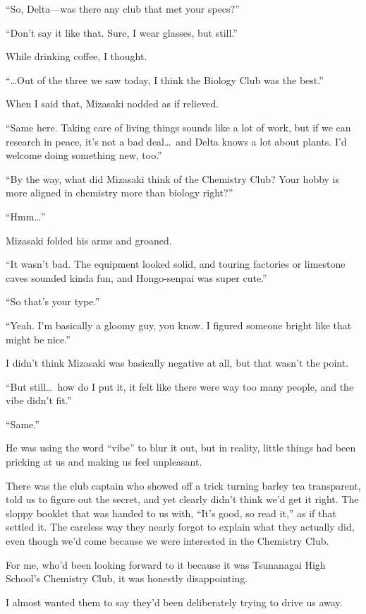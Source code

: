 \documentclass[
    a4paper,
    12pt,
    twoside,
    openany,
    UTF8,
    fontset=windows
]{ctexbook}
\begin{document}
``So, Delta---was there any club that met your specs?''

``Don't say it like that. Sure, I wear glasses, but still.''

While drinking coffee, I thought.

``\dots Out of the three we saw today, I think the Biology Club was the best.''

When I said that, Mizasaki nodded as if relieved.

``Same here. Taking care of living things sounds like a lot of work, but if we can research in peace, it's not a bad deal\dots\ and Delta knows a lot about plants. I'd welcome doing something new, too.''

``By the way, what did Mizasaki think of the Chemistry Club? Your hobby is more aligned in chemistry more than biology right?''

``Hmm\dots''

Mizasaki folded his arms and groaned.

``It wasn't bad. The equipment looked solid, and touring factories or limestone caves sounded kinda fun, and Hongo-senpai was super cute.''

``So that's your type.''

``Yeah. I'm basically a gloomy guy, you know. I figured someone bright like that might be nice.''

I didn't think Mizasaki was basically negative at all, but that wasn't the point.

``But still\dots\ how do I put it, it felt like there were way too many people, and the vibe didn't fit.''

``Same.''

He was using the word ``vibe'' to blur it out, but in reality, little things had been pricking at us and making us feel unpleasant.

There was the club captain who showed off a trick turning barley tea transparent, told us to figure out the secret, and yet clearly didn't think we'd get it right. The sloppy booklet that was handed to us with, ``It's good, so read it,'' as if that settled it. The careless way they nearly forgot to explain what they actually did, even though we'd come because we were interested in the Chemistry Club.

For me, who'd been looking forward to it because it was Tsunanagai High School's Chemistry Club, it was honestly disappointing.

I almost wanted them to say they'd been deliberately trying to drive us away.
\end{document}
